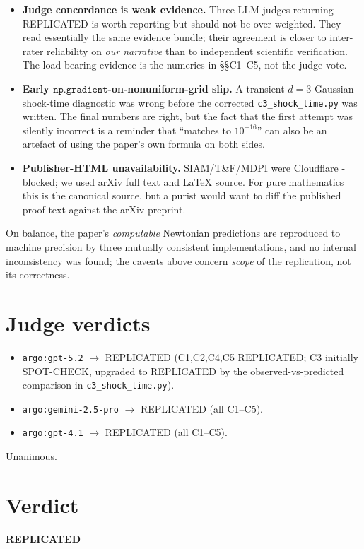 \documentclass[11pt]{article}
\begin{document}
\begin{itemize}
error in extracting the first blow-up time from the characteristic solve.
Reporting both without distinguishing them is misleadingly optimistic.
\item \textbf{Judge concordance is weak evidence.} Three LLM judges returning
REPLICATED is worth reporting but should not be over-weighted. They read
essentially the same evidence bundle; their agreement is closer to
inter-rater reliability on \emph{our narrative} than to independent scientific
verification. The load-bearing evidence is the numerics in
\S\S C1--C5, not the judge vote.
\item \textbf{Early $\texttt{np.gradient}$-on-nonuniform-grid slip.} A
transient $d=3$ Gaussian shock-time diagnostic was wrong before the
corrected \texttt{c3\_shock\_time.py} was written. The final numbers are
right, but the fact that the first attempt was silently incorrect is a
reminder that ``matches to $10^{-16}$'' can also be an artefact of using the
paper's own formula on both sides.
\item \textbf{Publisher-HTML unavailability.} SIAM/T\&F/MDPI were Cloudflare
-blocked; we used arXiv full text and LaTeX source. For pure mathematics
this is the canonical source, but a purist would want to diff the published
proof text against the arXiv preprint.
\end{itemize}
On balance, the paper's \emph{computable} Newtonian predictions are reproduced
to machine precision by three mutually consistent implementations, and no
internal inconsistency was found; the caveats above concern \emph{scope} of
the replication, not its correctness.

\section{Judge verdicts}
\begin{itemize}
\item \texttt{argo:gpt-5.2} $\rightarrow$ REPLICATED (C1,C2,C4,C5 REPLICATED;
C3 initially SPOT-CHECK, upgraded to REPLICATED by the observed-vs-predicted
comparison in \texttt{c3\_shock\_time.py}).
\item \texttt{argo:gemini-2.5-pro} $\rightarrow$ REPLICATED (all C1--C5).
\item \texttt{argo:gpt-4.1} $\rightarrow$ REPLICATED (all C1--C5).
\end{itemize}
Unanimous.

\section*{Verdict}
\centerline{\textbf{\Large REPLICATED}}
\end{document}
